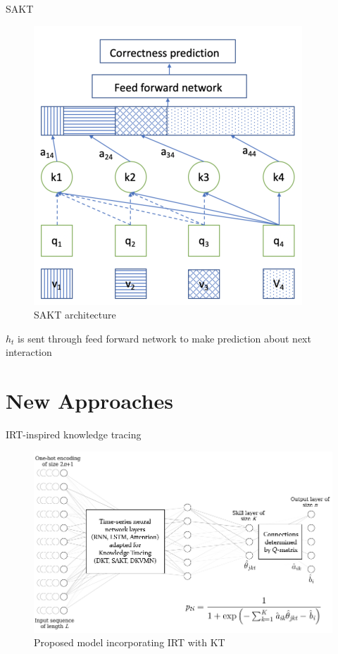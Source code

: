 \documentclass{beamer}
\theoremstyle{definition}
\begin{document}
\begin{frame}{SAKT}
  \begin{figure}
    \centering
    \includegraphics[width=.45\textwidth]{kt_img/sakt_arch.png}
    \caption{SAKT architecture}
    \label{fig:sakt}
  \end{figure}
  $h_t$ is sent through feed forward network to make prediction about next interaction
\end{frame}

\section{New Approaches}

\begin{frame}{IRT-inspired knowledge tracing}
  \begin{figure}
    \centering
    \includegraphics[width=1\textwidth]{kt_img/kt_irt_visual_with_equation.png}
    \caption{Proposed model incorporating IRT with KT}
    \label{fig:kt_irt}
  \end{figure}
\end{frame}
\end{document}
